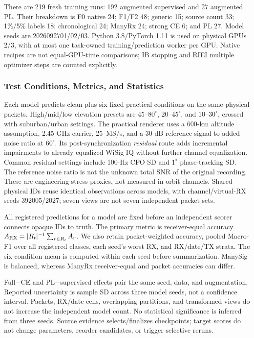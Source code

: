 There are 219 fresh training runs: 192 augmented supervised and 27 augmented PL. Their breakdown is F0 native 24; F1/F2 48; generic 15; source count 33; 1\%/5\% labels 18; chronological 24; ManyRx 24; strong CE 6; and PL 27. Model seeds are 2026092701/02/03. Python 3.8/PyTorch 1.11 is used on physical GPUs 2/3, with at most one task-owned training/prediction worker per GPU. Native recipes are not equal-GPU-time comparisons; IB stopping and RIEI multiple optimizer steps are counted explicitly.

\subsubsection{Test Conditions, Metrics, and Statistics}
Each model predicts clean plus six fixed practical conditions on the same physical packets. High/mid/low elevation presets are $45$--$80^\circ$, $20$--$45^\circ$, and $10$--$30^\circ$, crossed with suburban/urban settings. The practical renderer uses a 600-km altitude assumption, 2.45-GHz carrier, 25~MS/s, and a 30-dB reference signal-to-added-noise ratio at $60^\circ$. Its post-synchronization \emph{residual} route adds incremental impairments to already equalized WiSig IQ without further channel equalization. Common residual settings include 100-Hz CFO SD and $1^\circ$ phase-tracking SD. The reference noise ratio is not the unknown total SNR of the original recording. These are engineering stress proxies, not measured in-orbit channels. Shared physical IDs reuse identical observations across models, with channel/virtual-RX seeds 392005/2027; seven views are not seven independent packet sets.

All registered predictions for a model are fixed before an independent scorer connects opaque IDs to truth. The primary metric is receiver-equal accuracy $A_{\rm RX}=|R_t|^{-1}\sum_{r\in R_t}A_r$. We also retain packet-weighted accuracy, pooled Macro-F1 over all registered classes, each seed's worst RX, and RX/date/TX strata. The six-condition mean is computed within each seed before summarization. ManySig is balanced, whereas ManyRx receiver-equal and packet accuracies can differ.

Full$-$CE and PL$-$supervised effects pair the same seed, data, and augmentation. Reported uncertainty is sample SD across three model seeds, not a confidence interval. Packets, RX/date cells, overlapping partitions, and transformed views do not increase the independent model count. No statistical significance is inferred from three seeds. Source evidence selects/finalizes checkpoints; target scores do not change parameters, reorder candidates, or trigger selective reruns.

